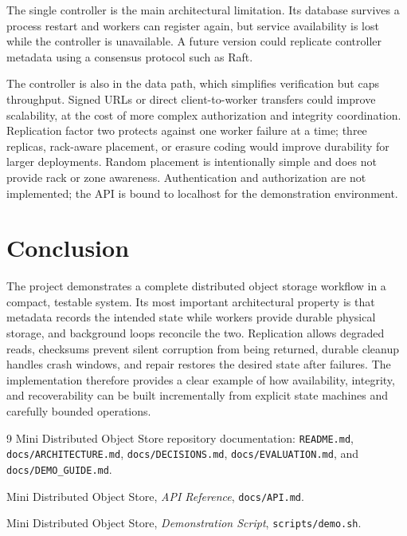 \documentclass[11pt,a4paper]{article}
\begin{document}
The single controller is the main architectural limitation. Its database survives a process restart and workers can register again, but service availability is lost while the controller is unavailable. A future version could replicate controller metadata using a consensus protocol such as Raft.

The controller is also in the data path, which simplifies verification but caps throughput. Signed URLs or direct client-to-worker transfers could improve scalability, at the cost of more complex authorization and integrity coordination. Replication factor two protects against one worker failure at a time; three replicas, rack-aware placement, or erasure coding would improve durability for larger deployments. Random placement is intentionally simple and does not provide rack or zone awareness. Authentication and authorization are not implemented; the API is bound to localhost for the demonstration environment.

\section{Conclusion}

The project demonstrates a complete distributed object storage workflow in a compact, testable system. Its most important architectural property is that metadata records the intended state while workers provide durable physical storage, and background loops reconcile the two. Replication allows degraded reads, checksums prevent silent corruption from being returned, durable cleanup handles crash windows, and repair restores the desired state after failures. The implementation therefore provides a clear example of how availability, integrity, and recoverability can be built incrementally from explicit state machines and carefully bounded operations.

\begin{thebibliography}{9}
Mini Distributed Object Store repository documentation: \texttt{README.md}, \texttt{docs/ARCHITECTURE.md}, \texttt{docs/DECISIONS.md}, \texttt{docs/EVALUATION.md}, and \texttt{docs/DEMO\_GUIDE.md}.

Mini Distributed Object Store, \emph{API Reference}, \texttt{docs/API.md}.

Mini Distributed Object Store, \emph{Demonstration Script}, \texttt{scripts/demo.sh}.
\end{thebibliography}
\end{document}
